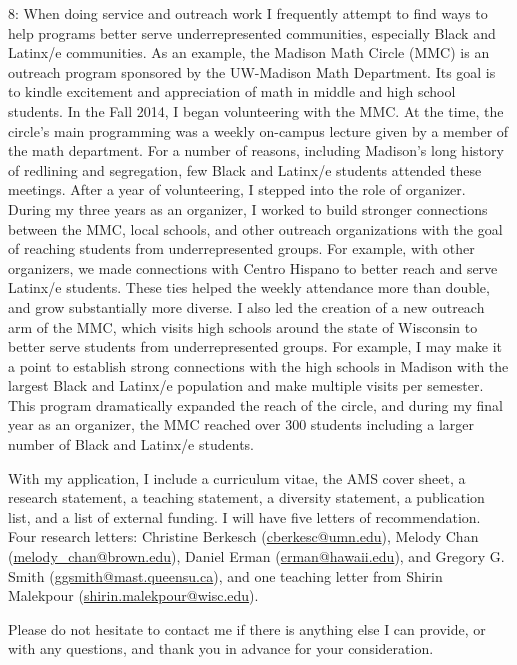 \documentclass[11pt]{article}
\begin{document}
8: When doing service and outreach work I frequently attempt to find ways to help programs better serve underrepresented communities, especially Black and Latinx/e communities. As an example, the Madison Math Circle (MMC) is an outreach program sponsored by the UW-Madison Math Department. Its goal is to kindle excitement and appreciation of math in middle and high school students. In the Fall 2014, I began volunteering with the MMC. At the time, the circle's main programming was a weekly on-campus lecture given by a member of the math department. For a number of reasons, including Madison's long history of redlining and segregation, few Black and Latinx/e students attended these meetings. After a year of volunteering, I stepped into the role of organizer. During my three years as an organizer, I worked to build stronger connections between the MMC, local schools, and other outreach organizations with the goal of reaching students from underrepresented groups. For example, with other organizers, we made connections with Centro Hispano to better reach and serve Latinx/e students. These ties helped the weekly attendance more than double, and grow substantially more diverse. I also led the creation of a new outreach arm of the MMC, which visits high schools around the state of Wisconsin to better serve students from underrepresented groups. For example, I may make it a point to establish strong connections with the high schools in Madison with the largest Black and Latinx/e population and make multiple visits per semester. This program dramatically expanded the reach of the circle, and during my final year as an organizer, the MMC reached over 300 students including a larger number of Black and Latinx/e students.

With my application, I include a curriculum vitae, the AMS cover sheet, a research statement, a teaching statement, a diversity statement, a publication list, and a list of external funding. I will have five letters of recommendation. Four research letters: Christine Berkesch (\href{mailto:cberkesc@umn.edu}{cberkesc@umn.edu}), Melody Chan (\href{mailto:melody\_chan@brown.edu}{melody\_chan@brown.edu}), Daniel Erman (\href{mailto:erman@hawaii.edu}{erman@hawaii.edu}), and Gregory G. Smith (\href{mailto:ggsmith@mast.queensu.ca}{ggsmith@mast.queensu.ca}), and one teaching letter from Shirin Malekpour (\href{mailto:shirin.malekpour@wisc.edu}{shirin.malekpour@wisc.edu}).  

Please do not hesitate to contact me if there is anything else I can provide, or with any questions, and thank you in advance for your consideration. 
\end{document}
